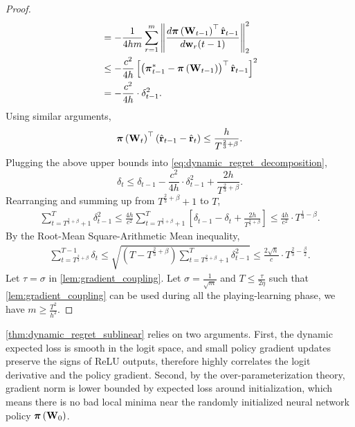 \begin{proof}
\begin{equation*}
\begin{split}
    &= - \frac{1}{4 h m} \sum\limits_{r=1}^{m}{ \left\| \frac{d {\boldsymbol{\pi}}\left( {\mathbf{W}}_{t-1} \right)^\top \hat{{\mathbf{r}}}_{t-1}}{d {\mathbf{w}}_r(t-1)} \right\|_2^2 } \\
    &\le - \frac{c^2}{4 h} \left[ \left( {{\boldsymbol{\pi}}_{t-1}^*} - {\boldsymbol{\pi}}\left( {\mathbf{W}}_{t-1} \right) \right)^\top \hat{{\mathbf{r}}}_{t-1}  \right]^2 \\
    &= - \frac{c^2}{4 h} \cdot \delta_{t-1}^2.
\end{split}
\end{equation*}
Using similar arguments,
\begin{equation*}
    {\boldsymbol{\pi}}\left( {\mathbf{W}}_t \right)^\top \left( \hat{{\mathbf{r}}}_{t-1} - \hat{{\mathbf{r}}}_t  \right) \le \frac{h}{T^{\frac{2}{3} + \beta}}.
\end{equation*}
Plugging the above upper bounds into \cref{eq:dynamic_regret_decomposition},
\begin{equation*}
    \delta_t \le \delta_{t-1} - \frac{c^2}{4 h} \cdot \delta_{t-1}^2 + \frac{2h}{T^{\frac{2}{3} + \beta}}.
\end{equation*}
Rearranging and summing up from $T^{\frac{2}{3} + \beta} + 1$ to $T$,
\begin{equation*}
\begin{split}
    \sum\limits_{t=T^{\frac{2}{3}+ \beta}+1}^{T}{\delta_{t-1}^2} \le \frac{4 h}{ c^2} \sum\limits_{t=T^{\frac{2}{3}+ \beta}+1}^{T} { \left[ \delta_{t-1} - \delta_t + \frac{2h}{T^{\frac{2}{3} + \beta}} \right] } \le \frac{4 h}{ c^2} \cdot T^{\frac{1}{3} - \beta}.
\end{split}
\end{equation*}
By the Root-Mean Square-Arithmetic Mean inequality,
\begin{equation*}
\begin{split}
    \sum\limits_{t=T^{\frac{2}{3}+ \beta}}^{T-1}{\delta_{t}} \le \sqrt{\left(T  - T^{\frac{2}{3}+ \beta} \right) \sum\limits_{t=T^{\frac{2}{3}+ \beta}+1}^{T}{\delta_{t-1}^2}} \le \frac{2 \sqrt{h}}{c} \cdot T^{\frac{2}{3} - \frac{\beta}{2}}.
\end{split}
\end{equation*}
Let $\tau = \sigma$ in \cref{lem:gradient_coupling}. Let $\sigma = \frac{1}{\sqrt{m}}$ and $T \le \frac{\tau}{2 \eta}$ such that \cref{lem:gradient_coupling} can be used during all the playing-learning phase, we have $m \ge \frac{T^2}{h^2}$.
\end{proof}



\cref{thm:dynamic_regret_sublinear} relies on two arguments. First, the dynamic expected loss is smooth in the logit space, and small policy gradient updates preserve the signs of ReLU outputs, therefore highly correlates the logit derivative and the policy gradient. Second, by the over-parameterization theory, gradient norm is lower bounded by expected loss around initialization, which means there is no bad local minima near the randomly initialized neural network policy ${\boldsymbol{\pi}}\left( {\mathbf{W}}_0 \right)$.

